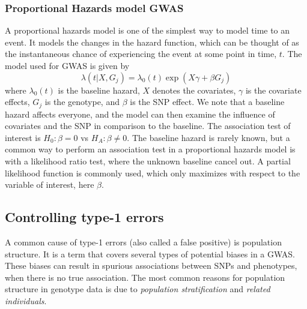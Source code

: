 \subsubsection{Proportional Hazards model GWAS}
A proportional hazards model is one of the simplest way to model time to an event. It models the changes in the hazard function, which can be thought of as the instantaneous chance of experiencing the event at some point in time, $ t $. The model used for GWAS is given by 
\begin{equation}
	\lambda(t | X, G_j) = \lambda_0(t)\exp(X\gamma + \beta G_j)
\end{equation}
where $ \lambda_0(t) $ is the baseline hazard, $ X $ denotes the covariates, $ \gamma $ is the covariate effects, $ G_j $ is the genotype, and $ \beta $ is the SNP effect. We note that a baseline hazard affects everyone, and the model can then examine the influence of covariates and the SNP in comparison to the baseline. The association test of interest is $ H_0: \beta = 0 $ vs $ H_A: \beta \neq 0 $. The baseline hazard is rarely known, but a common way to perform an association test in a proportional hazards model is with a likelihood ratio test, where the unknown baseline cancel out. A partial likelihood function is commonly used, which only maximizes with respect to the variable of interest, here $ \beta $.



\subsection{Controlling type-1 errors} \label{sec:controllingType1Errors}
A common cause of type-1 errors (also called a false positive) is population structure. It is a term that covers several types of potential biases in a GWAS. These biases can result in spurious associations between SNPs and phenotypes, when there is no true association. The most common reasons for population structure in genotype data is due to \textit{population stratification} and \textit{related individuals}. %

